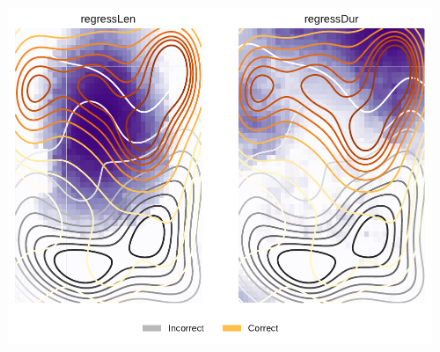 \documentclass[10pt,notes]{beamer}
\begin{document}
\begin{frame}{}
\begin{figure}
    \centering
    \includegraphics[height=\textheight]{eye_regress-eps-converted-to.pdf}
\end{figure}
\end{frame}
\end{document}
